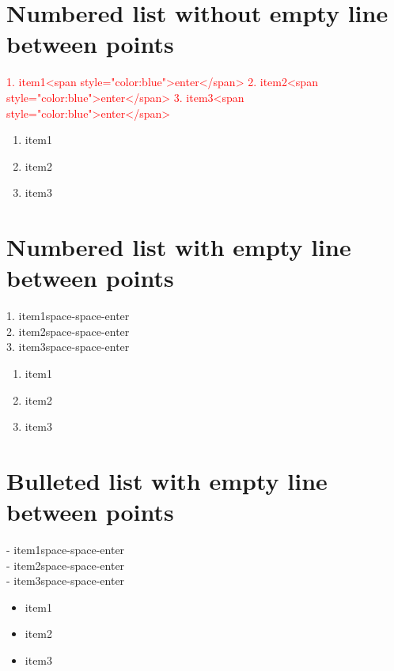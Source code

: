 \documentclass[]{article}
\author{}
\date{\vspace{-2.5em}}
\providecommand{\tightlist}{%
  \setlength{\itemsep}{0pt}\setlength{\parskip}{0pt}}
\begin{document}
\hypertarget{numbered-list-without-empty-line-between-points}{%
\section{Numbered list without empty line between
points}\label{numbered-list-without-empty-line-between-points}}

\textcolor{red}{
1. item1<span style="color:blue">enter</span>  
2. item2<span style="color:blue">enter</span>  
3. item3<span style="color:blue">enter</span> 
}

\begin{enumerate}
\def\labelenumi{\arabic{enumi}.}
\tightlist
\item
  item1
\item
  item2
\item
  item3
\end{enumerate}

\hypertarget{numbered-list-with-empty-line-between-points}{%
\section{Numbered list with empty line between
points}\label{numbered-list-with-empty-line-between-points}}

{ 1. item1{space-space-enter}\\
2. item2{space-space-enter}\\
3. item3{space-space-enter} }

\begin{enumerate}
\def\labelenumi{\arabic{enumi}.}
\tightlist
\item
  item1\\
\item
  item2\\
\item
  item3
\end{enumerate}

\hypertarget{bulleted-list-with-empty-line-between-points}{%
\section{Bulleted list with empty line between
points}\label{bulleted-list-with-empty-line-between-points}}

{ - item1{space-space-enter}\\
- item2{space-space-enter}\\
- item3{space-space-enter} }

\begin{itemize}
\tightlist
\item
  item1\\
\item
  item2\\
\item
  item3
\end{itemize}
\end{document}
